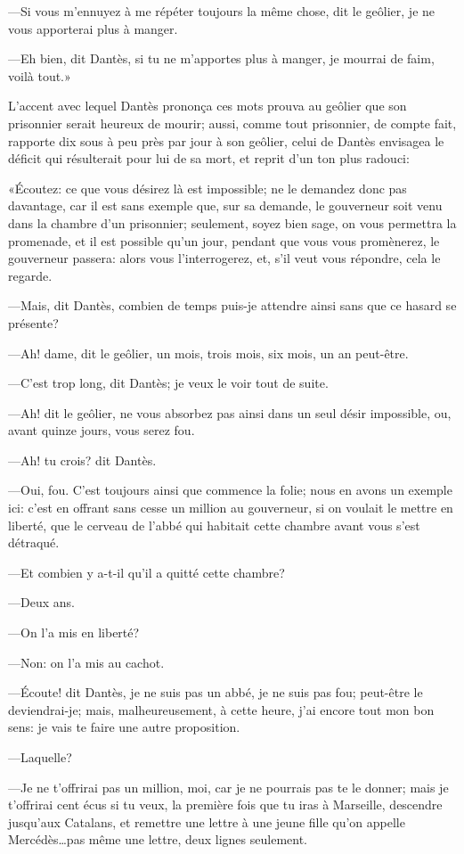 —Si vous m'ennuyez à me répéter toujours la même chose, dit le geôlier, je ne vous apporterai plus à manger.

—Eh bien, dit Dantès, si tu ne m'apportes plus à manger, je mourrai de faim, voilà tout.»

L'accent avec lequel Dantès prononça ces mots prouva au geôlier que son prisonnier serait heureux de mourir; aussi, comme tout prisonnier, de compte fait, rapporte dix sous à peu près par jour à son geôlier, celui de Dantès envisagea le déficit qui résulterait pour lui de sa mort, et reprit d'un ton plus radouci:

«Écoutez: ce que vous désirez là est impossible; ne le demandez donc pas davantage, car il est sans exemple que, sur sa demande, le gouverneur soit venu dans la chambre d'un prisonnier; seulement, soyez bien sage, on vous permettra la promenade, et il est possible qu'un jour, pendant que vous vous promènerez, le gouverneur passera: alors vous l'interrogerez, et, s'il veut vous répondre, cela le regarde.

—Mais, dit Dantès, combien de temps puis-je attendre ainsi sans que ce hasard se présente?

—Ah! dame, dit le geôlier, un mois, trois mois, six mois, un an peut-être.

—C'est trop long, dit Dantès; je veux le voir tout de suite.

—Ah! dit le geôlier, ne vous absorbez pas ainsi dans un seul désir impossible, ou, avant quinze jours, vous serez fou.

—Ah! tu crois? dit Dantès.

—Oui, fou. C'est toujours ainsi que commence la folie; nous en avons un exemple ici: c'est en offrant sans cesse un million au gouverneur, si on voulait le mettre en liberté, que le cerveau de l'abbé qui habitait cette chambre avant vous s'est détraqué.

—Et combien y a-t-il qu'il a quitté cette chambre?

—Deux ans.

—On l'a mis en liberté?

—Non: on l'a mis au cachot.

—Écoute! dit Dantès, je ne suis pas un abbé, je ne suis pas fou; peut-être le deviendrai-je; mais, malheureusement, à cette heure, j'ai encore tout mon bon sens: je vais te faire une autre proposition.

—Laquelle?

—Je ne t'offrirai pas un million, moi, car je ne pourrais pas te le donner; mais je t'offrirai cent écus si tu veux, la première fois que tu iras à Marseille, descendre jusqu'aux Catalans, et remettre une lettre à une jeune fille qu'on appelle Mercédès\dots pas même une lettre, deux lignes seulement.


